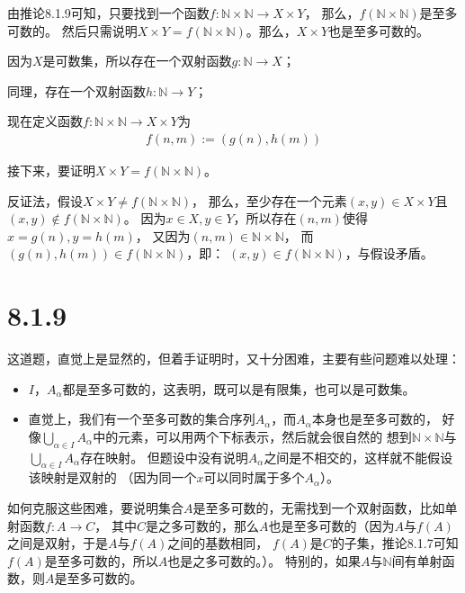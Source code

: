 \documentclass{article}
\theoremstyle{mystyle}
\begin{document}
由推论8.1.9可知，只要找到一个函数$f: \mathbb{N} \times \mathbb{N} \rightarrow X \times Y$，
那么，$f(\mathbb{N} \times \mathbb{N})$是至多可数的。
然后只需说明$X \times Y = f(\mathbb{N} \times \mathbb{N})$。那么，$X \times Y$也是至多可数的。

因为$X$是可数集，所以存在一个双射函数$g: \mathbb{N} \rightarrow X$；

同理，存在一个双射函数$h: \mathbb{N} \rightarrow Y$；

现在定义函数$f: \mathbb{N} \times \mathbb{N} \rightarrow X \times Y$为
\begin{align*}
  f(n,m) := (g(n), h(m))
\end{align*}

接下来，要证明$X \times Y = f(\mathbb{N} \times \mathbb{N})$。

反证法，假设$X \times Y \neq f(\mathbb{N} \times \mathbb{N})$，
那么，至少存在一个元素$(x,y) \in X \times Y$且$(x,y) \not \in f(\mathbb{N} \times \mathbb{N})$。
因为$x \in X, y\in Y$，所以存在$(n,m)$使得$x = g(n), y=h(m)$，
又因为$(n,m) \in \mathbb{N} \times \mathbb{N}$，
而$(g(n),h(m)) \in f(\mathbb{N} \times \mathbb{N})$，即：
$(x,y) \in f(\mathbb{N} \times \mathbb{N})$，与假设矛盾。


\section*{8.1.9}

这道题，直觉上是显然的，但着手证明时，又十分困难，主要有些问题难以处理：

\begin{itemize}
  \item $I，A_{\alpha}$都是至多可数的，这表明，既可以是有限集，也可以是可数集。
  \item 直觉上，我们有一个至多可数的集合序列$A_{\alpha}$，而$A_{\alpha}$本身也是至多可数的，
  好像$\bigcup \limits_{\alpha \in I} A_{\alpha}$中的元素，可以用两个下标表示，然后就会很自然的
  想到$\mathbb{N} \times \mathbb{N}$与$\bigcup \limits_{\alpha \in I} A_{\alpha}$存在映射。
  但题设中没有说明$A_{\alpha}$之间是不相交的，这样就不能假设该映射是双射的
  （因为同一个$x$可以同时属于多个$A_{\alpha}$）。
\end{itemize}

如何克服这些困难，要说明集合$A$是至多可数的，无需找到一个双射函数，比如单射函数$f: A \rightarrow C$，
其中$C$是之多可数的，那么$A$也是至多可数的（因为$A$与$f(A)$之间是双射，于是$A$与$f(A)$之间的基数相同，
$f(A)$是$C$的子集，推论8.1.7可知$f(A)$是至多可数的，所以$A$也是之多可数的。）。
特别的，如果$A$与$\mathbb{N}$间有单射函数，则$A$是至多可数的。
\end{document}
